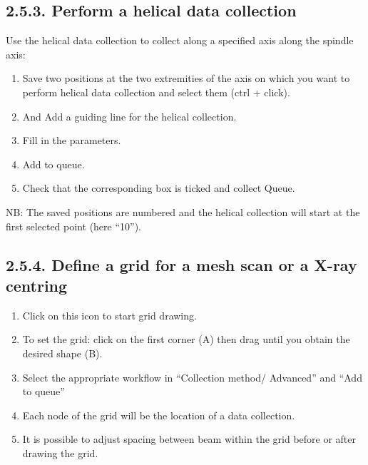 \documentclass[a4paper,10pt,english]{sphinxmanual}
\begin{document}
\subsection{2.5.3. Perform a helical data collection}
\label{user_manual:perform-a-helical-data-collection}
Use the helical data collection to collect along a specified axis along the spindle axis:
\begin{enumerate}
\item {} 
Save two positions at the two extremities of the axis on which  you want to perform helical data collection and select them (ctrl + click).

\item {} 
And Add a guiding line for the helical collection.

\item {} 
Fill in the parameters.

\item {} 
Add to queue.

\item {} 
Check that the corresponding box is ticked and collect Queue.

\end{enumerate}

NB: The saved positions are numbered and the helical collection will start at the first selected point (here “10”).


\subsection{2.5.4. Define a grid for a mesh scan or a X-ray centring}
\label{user_manual:define-a-grid-for-a-mesh-scan-or-a-x-ray-centring}\begin{enumerate}
\item {} 
Click on this icon to start grid drawing.

\item {} 
To set the grid: click on the first corner (A) then drag until you obtain the desired shape (B).

\item {} 
Select the appropriate workflow in “Collection method/ Advanced” and “Add to queue”

\item {} 
Each node of the grid will be the location of a data collection.

\item {} 
It is possible to adjust spacing between beam within the grid before or after drawing the grid.

\end{enumerate}
\end{document}
